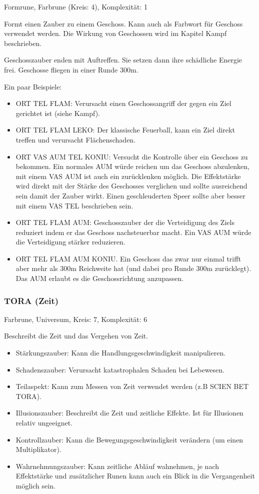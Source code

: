 \documentclass{article}
\begin{document}
Formrune, Farbrune (Kreis: 4), Komplexität: 1

Formt einen Zauber zu einem Geschoss. Kann auch als Farbwort für Geschoss verwendet werden. Die Wirkung von
Geschossen wird im Kapitel Kampf beschrieben.

Geschosszauber enden mit Auftreffen. Sie setzen dann ihre schädliche Energie frei. Geschosse fliegen in einer
Runde 300m.

Ein paar Beispiele:

\begin{itemize}
\item ORT TEL FLAM: Verursacht einen Geschossangriff der gegen ein Ziel gerichtet ist (siehe Kampf).
\item ORT TEL FLAM LEKO: Der klassische Feuerball, kann ein Ziel direkt treffen und verursacht Flächenschaden.
\item ORT VAS AUM TEL KONIU: Versucht die Kontrolle über ein Geschoss zu bekommen. Ein normales AUM würde reichen um das Geschoss abzulenken, mit einem VAS AUM ist auch ein zurücklenken möglich. Die Effektstärke wird direkt mit der Stärke des Geschosses verglichen und sollte ausreichend sein damit der Zauber wirkt. Einen geschleuderten Speer sollte aber besser mit einem VAS TEL beschrieben sein.
\item ORT TEL FLAM AUM: Geschosszauber der die Verteidigung des Ziels reduziert indem er das Geschoss nachsteuerbar macht. Ein VAS AUM würde die Verteidigung stärker reduzieren.
\item ORT TEL FLAM AUM KONIU. Ein Geschoss das zwar nur einmal trifft aber mehr als 300m Reichweite hat (und dabei pro Runde 300m zurücklegt). Das AUM erlaubt es die Geschossrichtung anzupassen.
\end{itemize}

\subsubsection{TORA (Zeit)}

Farbrune, Universum, Kreis: 7, Komplexität: 6

Beschreibt die Zeit und das Vergehen von Zeit.

\begin{itemize}
\item Stärkungszauber: Kann die Handlungsgeschwindigkeit manipulieren.
\item Schadenszauber: Verursacht katastrophalen Schaden bei Lebewesen.
\item Teilaspekt: Kann zum Messen von Zeit verwendet werden (z.B SCIEN BET TORA).
\item Illusionszauber: Beschreibt die Zeit und zeitliche Effekte. Ist für Illusionen relativ ungeeignet.
\item Kontrollzauber: Kann die Bewegungsgeschwindigkeit verändern (um einen Multiplikator).
\item Wahrnehmungszauber: Kann zeitliche Abläuf wahnehmen, je nach Effektstärke und zusätzlicher Runen kann auch ein Blick in die Vergangenheit möglich sein.
\end{itemize}
\end{document}
